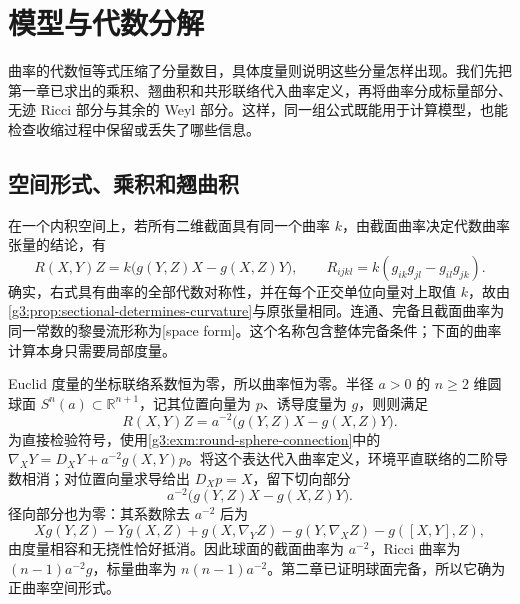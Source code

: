 
% 
% 
% 

\section{模型与代数分解}
\label{g3:sec:0304}

曲率的代数恒等式压缩了分量数目，具体度量则说明这些分量怎样出现。我们先把第一章已求出的乘积、翘曲积和共形联络代入曲率定义，再将曲率分成标量部分、无迹 Ricci 部分与其余的 Weyl 部分。这样，同一组公式既能用于计算模型，也能检查收缩过程中保留或丢失了哪些信息。

\subsection{空间形式、乘积和翘曲积}
\label{g3:subsec:0304:01}

在一个内积空间上，若所有二维截面具有同一个曲率 \(k\)，由截面曲率决定代数曲率张量的结论，有
\begin{equation}\label{g3:eq:constant-curvature-tensor}
	R(X,Y)Z=k\bigl(g(Y,Z)X-g(X,Z)Y\bigr),\qquad
	R_{ijkl}=k(g_{ik}g_{jl}-g_{il}g_{jk}).
\end{equation}
确实，右式具有曲率的全部代数对称性，并在每个正交单位向量对上取值 \(k\)，故由\cref{g3:prop:sectional-determines-curvature}与原张量相同。连通、完备且截面曲率为同一常数的黎曼流形称为[space form]。这个名称包含整体完备条件；下面的曲率计算本身只需要局部度量。

\begin{example}\label{g3:exm:space-form-curvature}
	Euclid 度量的坐标联络系数恒为零，所以曲率恒为零。半径 \(a>0\) 的 \(n\ge2\) 维圆球面 \(S^n(a)\subset\mathbb R^{n+1}\)，记其位置向量为 \(p\)、诱导度量为 \(g\)，则则满足
	\[
		R(X,Y)Z=a^{-2}\bigl(g(Y,Z)X-g(X,Z)Y\bigr).
	\]
	为直接检验符号，使用\cref{g3:exm:round-sphere-connection}中的 \(\nabla_XY=D_XY+a^{-2}g(X,Y)p\)。将这个表达代入曲率定义，环境平直联络的二阶导数相消；对位置向量求导给出 \(D_Xp=X\)，留下切向部分
	\[
		a^{-2}\bigl(g(Y,Z)X-g(X,Z)Y\bigr).
	\]
	径向部分也为零：其系数除去 \(a^{-2}\) 后为
	\[
		Xg(Y,Z)-Yg(X,Z)+g(X,\nabla_YZ)
		-g(Y,\nabla_XZ)-g([X,Y],Z),
	\]
	由度量相容和无挠性恰好抵消。因此球面的截面曲率为 \(a^{-2}\)，Ricci 曲率为 \((n-1)a^{-2}g\)，标量曲率为 \(n(n-1)a^{-2}\)。第二章已证明球面完备，所以它确为正曲率空间形式。
\end{example}

